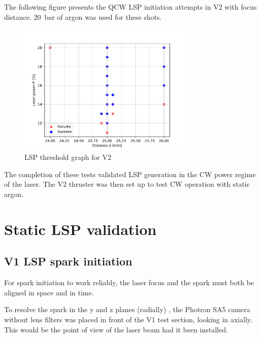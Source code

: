             The following figure presents the QCW LSP initiation attempts in V2 with focus distance. \qty{20}{bar} of argon was used for these shots.
            \begin{figure}[!ht]
                \centering
                \includegraphics[width=0.75\textwidth]{assets/4 experiments/V2_focus_threshold.pdf}
                \caption{LSP threshold graph for V2}
            \end{figure}
            The completion of these tests validated LSP generation in the CW power regime of the laser. The V2 thruster was then set up to test CW operation with static argon.

    \section{Static LSP validation}

        \subsection{V1 LSP spark initiation}

            For spark initiation to work reliably, the laser focus and the spark must both be aligned in space and in time.

            To resolve the spark in the y and z planes (radially) , the Photron SA5 camera without lens filters was placed in front of the V1 test section, looking in axially. This would be the point of view of the laser beam had it been installed. 


